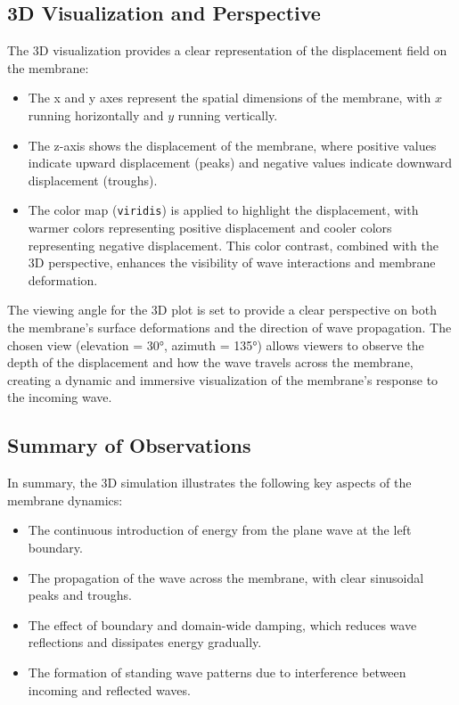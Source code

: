 \documentclass{article}
\begin{document}
\subsection{3D Visualization and Perspective}
The 3D visualization provides a clear representation of the displacement field on the membrane:
\begin{itemize}
    \item The x and y axes represent the spatial dimensions of the membrane, with $x$ running horizontally and $y$ running vertically.
    \item The z-axis shows the displacement of the membrane, where positive values indicate upward displacement (peaks) and negative values indicate downward displacement (troughs).
    \item The color map (\texttt{viridis}) is applied to highlight the displacement, with warmer colors representing positive displacement and cooler colors representing negative displacement. This color contrast, combined with the 3D perspective, enhances the visibility of wave interactions and membrane deformation.
\end{itemize}

The viewing angle for the 3D plot is set to provide a clear perspective on both the membrane's surface deformations and the direction of wave propagation. The chosen view (elevation = 30°, azimuth = 135°) allows viewers to observe the depth of the displacement and how the wave travels across the membrane, creating a dynamic and immersive visualization of the membrane’s response to the incoming wave.

\subsection{Summary of Observations}
In summary, the 3D simulation illustrates the following key aspects of the membrane dynamics:
\begin{itemize}
    \item The continuous introduction of energy from the plane wave at the left boundary.
    \item The propagation of the wave across the membrane, with clear sinusoidal peaks and troughs.
    \item The effect of boundary and domain-wide damping, which reduces wave reflections and dissipates energy gradually.
    \item The formation of standing wave patterns due to interference between incoming and reflected waves.
\end{itemize}
\end{document}
